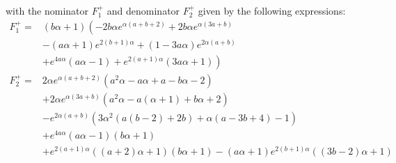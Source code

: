 with the nominator $F_1^+$ and denominator $F_2^+$ given by the following expressions:
\begin{align}
    F_1^+ = & (b \alpha+1) \left(-2 b \alpha e^{\alpha (a+b+2)}+2 b \alpha e^{\alpha (3 a+b)} \right. \nonumber \\
            &-(a \alpha+1) e^{2 (b+1) \alpha}+(1-3 a \alpha) e^{2 \alpha (a+b)} \nonumber \\
            & \left. +e^{4 a \alpha} (a \alpha-1)+e^{2 (a+1) \alpha} (3 a \alpha+1)\right) \\
    F_2^+ = & 2 \alpha e^{\alpha (a+b+2)} \left(a^2 \alpha-a \alpha+a-b \alpha-2\right) \nonumber \\
            &+2 \alpha e^{\alpha (3 a+b)} \left(a^2 \alpha-a (\alpha+1)+b \alpha+2\right) \nonumber \\
            &-e^{2 \alpha (a+b)} \left(3 \alpha^2 (a (b-2)+2 b)+\alpha (a-3 b+4)-1 \right) \nonumber \\
            &+e^{4 a \alpha} (a \alpha-1) (b \alpha+1) \nonumber \\
            &+e^{2 (a+1) \alpha} ((a+2) \alpha+1) (b \alpha+1)-(a \alpha+1) e^{2 (b+1) \alpha} ((3 b-2) \alpha+1)
\end{align}


